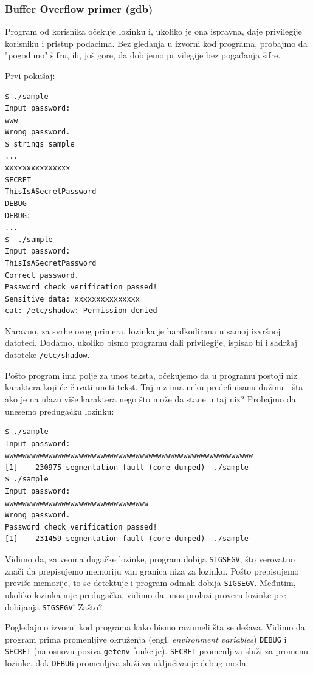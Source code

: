 \subsubsection{Buffer Overflow primer (gdb)}\label{buffer-overflow-primer-gdb}

Program od korisnika očekuje lozinku i, ukoliko je ona ispravna, daje privilegije korisniku i pristup podacima. Bez gledanja u izvorni kod programa, probajmo da "pogodimo" šifru, ili, još gore, da dobijemo privilegije bez pogađanja šifre.

Prvi pokušaj:

\begin{verbatim}
$ ./sample
Input password:
www
Wrong password.
$ strings sample
...
xxxxxxxxxxxxxxx
SECRET
ThisIsASecretPassword
DEBUG
DEBUG:
...
$  ./sample
Input password:
ThisIsASecretPassword
Correct password.
Password check verification passed!
Sensitive data: xxxxxxxxxxxxxxx
cat: /etc/shadow: Permission denied
\end{verbatim}

Naravno, za svrhe ovog primera, lozinka je hardkodirana u samoj izvršnoj datoteci. Dodatno, ukoliko bismo programu dali privilegije, ispisao bi i sadržaj datoteke \texttt{/etc/shadow}.

Pošto program ima polje za unos teksta, očekujemo da u programu postoji niz karaktera koji će čuvati uneti tekst. Taj niz ima neku predefinisanu dužinu - šta ako je na ulazu više karaktera nego što može da stane u taj niz? Probajmo da unesemo predugačku lozinku:

\begin{verbatim}
$ ./sample
Input password:
wwwwwwwwwwwwwwwwwwwwwwwwwwwwwwwwwwwwwwwwwwwwwwwwwwwwwwwww
[1]    230975 segmentation fault (core dumped)  ./sample
$ ./sample
Input password:
wwwwwwwwwwwwwwwwwwwwwwwwwwwwwwwww
Wrong password.
Password check verification passed!
[1]    231459 segmentation fault (core dumped)  ./sample
\end{verbatim}

Vidimo da, za veoma dugačke lozinke, program dobija \texttt{SIGSEGV}, što verovatno znači da prepisujemo memoriju van granica niza za lozinku. Pošto prepisujemo previše memorije, to se detektuje i program odmah dobija \texttt{SIGSEGV}. Međutim, ukoliko lozinka nije predugačka, vidimo da unos prolazi proveru lozinke pre dobijanja \texttt{SIGSEGV}! Zašto?

Pogledajmo izvorni kod programa kako bismo razumeli šta se dešava. Vidimo da program prima promenljive okruženja (engl. \emph{environment variables}) \texttt{DEBUG} i \texttt{SECRET} (na osnovu poziva \texttt{getenv} funkcije). \texttt{SECRET} promenljiva služi za promenu lozinke, dok \texttt{DEBUG} promenljiva služi za uključivanje debug moda:

